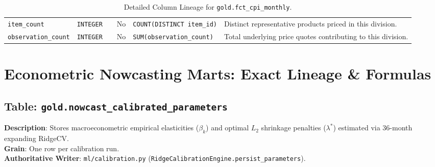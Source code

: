 \documentclass[a4paper, 11pt]{article}
\begin{document}
\begin{table}[H]
\begin{tabularx}{\textwidth}{l p{2.5cm} c c p{4.2cm} X}
\texttt{item\_count} & \texttt{INTEGER} & & No & \texttt{COUNT(DISTINCT item\_id)} & Distinct representative products priced in this division. \\
\texttt{observation\_count} & \texttt{INTEGER} & & No & \texttt{SUM(observation\_count)} & Total underlying price quotes contributing to this division. \\
\bottomrule
\end{tabularx}
\caption{Detailed Column Lineage for \texttt{gold.fct\_cpi\_monthly}.}
\end{table}

\newpage
\section{Econometric Nowcasting Marts: Exact Lineage \& Formulas}

\subsection{Table: \texttt{gold.nowcast\_calibrated\_parameters}}
\textbf{Description}: Stores macroeconometric empirical elasticities ($\beta_k$) and optimal $L_2$ shrinkage penalties ($\lambda^*$) estimated via 36-month expanding RidgeCV. \\
\textbf{Grain}: One row per calibration run. \\
\textbf{Authoritative Writer}: \texttt{ml/calibration.py} (\texttt{RidgeCalibrationEngine.persist\_parameters}).
\end{document}
